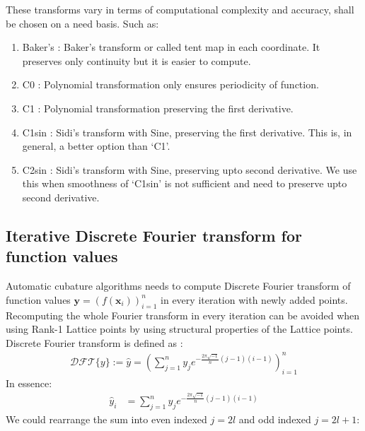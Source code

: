 \documentclass[twocolumn]{svjour3}          %
\newcommand{\bm}[1]{\boldsymbol{#1}}
\newcommand{\vx}{\bm{x}}
\newcommand{\vy}{\bm{y}}
\begin{document}
These transforms vary in terms of computational complexity and accuracy, shall be chosen on a need basis.
Such as:
\begin{enumerate}
\item Baker's : Baker's transform or called tent map in each coordinate. It preserves only continuity but it is easier to compute.
\item C0 : Polynomial transformation only ensures periodicity of function.
\item C1 : Polynomial transformation preserving the first derivative.
\item C1sin : Sidi's transform with Sine, preserving the first derivative. This is, in general, a better option than `C1'.
\item C2sin : Sidi's transform with Sine, preserving upto second derivative. We use this when smoothness of `C1sin' is not sufficient and need to preserve upto second derivative.
\end{enumerate}






\subsection{Iterative Discrete Fourier transform for function values}

Automatic cubature algorithms needs to compute Discrete Fourier transform of function values $\vy = \left(f(\vx_i)\right)_{i=1}^n$ in every iteration with newly added points. Recomputing the whole Fourier transform in every iteration can be avoided when using Rank-1 Lattice points by using structural properties of the Lattice points.  
Discrete Fourier transform is defined as :
\begin{align*}
\mathcal{DFT} \{y \} := \hat{y} = \left( \sum_{j=1}^{n} y_j 
e^{-\frac{2\pi \sqrt{-1}}{n} (j-1) (i-1) }
\right)_{i=1}^{n}
\end{align*}
In essence:
\begin{align*}
\hat{y}_i &=  \sum_{j=1}^{n} y_j 
e^{- \frac{2\pi \sqrt{-1}}{n} (j-1) (i-1) }
\end{align*}
We could rearrange the sum into even indexed $j=2l$ and odd indexed $j=2 l + 1$:
\end{document}
